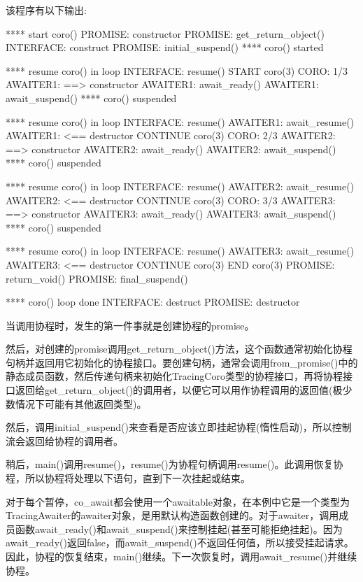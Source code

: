 该程序有以下输出:

\begin{shell}
**** start coro()
      PROMISE: constructor
      PROMISE: get_return_object()
        INTERFACE: construct
      PROMISE: initial_suspend()
**** coro() started

**** resume coro() in loop
        INTERFACE: resume()
  START coro(3)
  CORO: 1/3
          AWAITER1: ==> constructor
          AWAITER1: await_ready()
          AWAITER1: await_suspend()
**** coro() suspended

**** resume coro() in loop
        INTERFACE: resume()
          AWAITER1: await_resume()
          AWAITER1: <== destructor
  CONTINUE coro(3)
  CORO: 2/3
          AWAITER2: ==> constructor
          AWAITER2: await_ready()
          AWAITER2: await_suspend()
**** coro() suspended

**** resume coro() in loop
        INTERFACE: resume()
          AWAITER2: await_resume()
          AWAITER2: <== destructor
  CONTINUE coro(3)
  CORO: 3/3
          AWAITER3: ==> constructor
          AWAITER3: await_ready()
          AWAITER3: await_suspend()
**** coro() suspended

**** resume coro() in loop
        INTERFACE: resume()
          AWAITER3: await_resume()
          AWAITER3: <== destructor
  CONTINUE coro(3)
  END coro(3)
      PROMISE: return_void()
      PROMISE: final_suspend()
      
**** coro() loop done
        INTERFACE: destruct
      PROMISE: destructor
\end{shell}

当调用协程时，发生的第一件事就是创建协程的promise。

然后，对创建的promise调用get\_return\_object()方法，这个函数通常初始化协程句柄并返回用它初始化的协程接口。要创建句柄，通常会调用from\_promise()中的静态成员函数，然后传递句柄来初始化TracingCoro类型的协程接口，再将协程接口返回给get\_return\_object()的调用者，以便它可以用作协程调用的返回值(极少数情况下可能有其他返回类型)。

然后，调用initial\_suspend()来查看是否应该立即挂起协程(惰性启动)，所以控制流会返回给协程的调用者。

稍后，main()调用resume()，resume()为协程句柄调用resume()。此调用恢复协程，所以协程将处理以下语句，直到下一次挂起或结束。

对于每个暂停，co\_await都会使用一个awaitable对象，在本例中它是一个类型为TracingAwaiter的awaiter对象，是用默认构造函数创建的。对于awaiter，调用成员函数await\_ready()和await\_suspend()来控制挂起(甚至可能拒绝挂起)。因为await\_ready()返回false，而await\_suspend()不返回任何值，所以接受挂起请求。因此，协程的恢复结束，main()继续。下一次恢复时，调用await\_resume()并继续协程。

